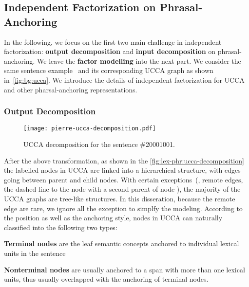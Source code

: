 \subsection{Independent Factorization on Phrasal-Anchoring}
\label{ssec:lex-phr:phr-factorization-analysis}
In the following, we focus on the first two main challenge in
independent factorization: \textbf{output decomposition} and
\textbf{input decomposition} on phrasal-anchoring. We leave the
\textbf{factor modelling} into the next part. We consider the same
sentence example~ and its corresponding UCCA graph as
shown in~\autoref{fig:bg:ucca}. We introduce the details of
independent factorization for UCCA and other pharsal-anchoring
representations.

\subsubsection{Output Decomposition}
\label{sssec:lex-phr:phr-output-decomposition}
\begin{figure}[!tbp]
  \centering
  \texttt{[image: pierre-ucca-decomposition.pdf]}
  \caption{\label{fig:lex-phr:ucca-decomposition} UCCA decomposition
    for the sentence \#20001001.}
\end{figure}

After the above transformation, as shown in the
\autoref{fig:lex-phr:ucca-decomposition} the labelled nodes in UCCA
are linked into a hierarchical structure, with edges going between
parent and child nodes. With certain exceptions~(\eg, remote edges,
the dashed line to the node  with a second parent of node
), the majority of the UCCA graphs are tree-like
structures. In this disseration, because the remote edge are rare, we
ignore all the exception to simplfy the modeling. According to the
position as well as the anchoring style, nodes in UCCA can naturally
classified into the following two types:

\begin{inparaenum}
\item \textbf{Terminal nodes} are the leaf semantic
  concepts anchored to individual lexical units in the sentence

\item \textbf{Nonterminal nodes} are usually anchored to a span with
  more than one lexical units, thus usually overlapped with the
  anchoring of terminal nodes.
\end{inparaenum}

